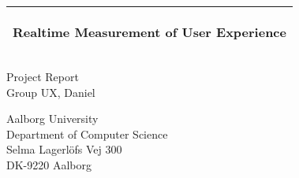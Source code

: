 %
\begin{titlepage}
  \addtolength{\hoffset}{0.5\evensidemargin-0.5\oddsidemargin} %
  \noindent%
  \begin{tabular}{@{}p{\textwidth}@{}}
    \toprule[2pt]
    \midrule
    \vspace{0.2cm}
    \begin{center}
        \Huge{\textbf{%
      Realtime Measurement of User Experience
    }}
    \end{center}
    \begin{center}
      \Large{%
          
      }
    \end{center}
    \vspace{0.2cm}\\
    \midrule
    \toprule[2pt]
  \end{tabular}
  \vspace{4 cm}
  \begin{center}
    {\large
      Project Report%
    }\\
    \vspace{0.2cm}
    {\Large
      Group UX, Daniel%
    }
  \end{center}
  \vfill
  \begin{center}
  Aalborg University\\
  Department of Computer Science\\
  Selma Lagerlöfs Vej 300\\
  DK-9220 Aalborg
  \end{center}
\end{titlepage}
\clearpage
